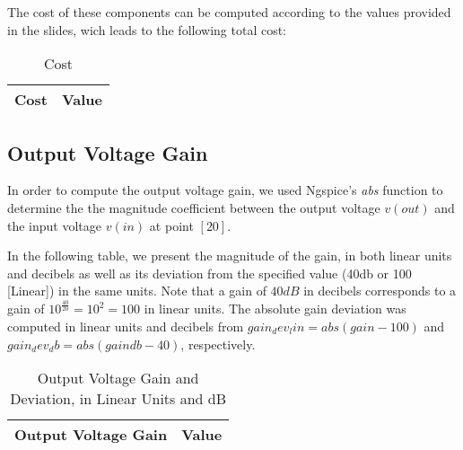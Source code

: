 The cost of these components can be computed according to the values provided in the slides, wich leads to the following total cost:

\begin{table}[H]
  \centering
  \begin{tabular}{ |l|r| } 
    \hline    
    {\bf Cost} & {\bf Value} \\ \hline
    
  \end{tabular}
  \caption{Cost}
  \label{tab:cost}
\end{table}


\subsection{Output Voltage Gain}
\label{output_gain}
\par In order to compute the output voltage gain, we used Ngspice's \textit{abs} function to determine the the magnitude coefficient between the output voltage $v(out)$ and the input voltage $v(in)$ at point $[20]$.

 \par In the following table, we present the magnitude of the gain, in both linear units and decibels as well as its deviation from the specified value (40db or 100 [Linear]) in the same units.
 Note that a gain of $40dB$ in decibels corresponds to a gain of $10^{\frac{40}{20}}=10^2=100$ in linear units.
 The absolute gain deviation was computed in linear units and decibels from $gain_dev_lin= abs(gain-100)$ and $gain_dev_db = abs(gaindb-40)$, respectively. 
 
\begin{table}[H]
  \centering
  \begin{tabular}{|l|r|}
    \hline    
    {\bf Output Voltage Gain} & {\bf Value} \\ \hline
    
  \end{tabular}
  \caption{Output Voltage Gain and Deviation, in Linear Units and dB}
  \label{tab:gain}
\end{table}



